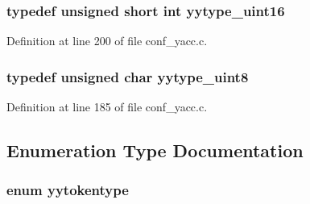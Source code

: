 \subsubsection[{yytype\_\-uint16}]{\setlength{\rightskip}{0pt plus 5cm}typedef unsigned short int {\bf yytype\_\-uint16}}\label{conf__yacc_8c_00c27c9da5ed06a830b216c8934e6b28}




Definition at line 200 of file conf\_\-yacc.c.
\subsubsection[{yytype\_\-uint8}]{\setlength{\rightskip}{0pt plus 5cm}typedef unsigned char {\bf yytype\_\-uint8}}\label{conf__yacc_8c_79c09f9dcfd0f7a32f598ea3910d2206}




Definition at line 185 of file conf\_\-yacc.c.

\subsection{Enumeration Type Documentation}
\subsubsection[{yytokentype}]{\setlength{\rightskip}{0pt plus 5cm}enum {\bf yytokentype}}\label{conf__yacc_8c_15c9f7bd2f0e9686df5d9df4f3314aa9}



